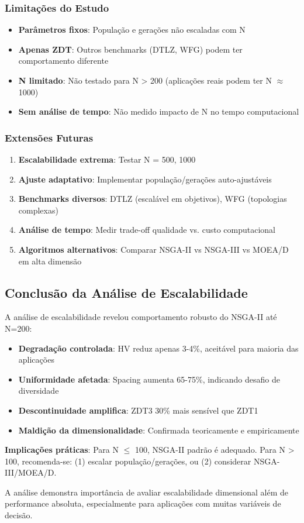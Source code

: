 \subsubsection{Limitações do Estudo}

\begin{itemize}
    \item \textbf{Parâmetros fixos}: População e gerações não escaladas com N
    \item \textbf{Apenas ZDT}: Outros benchmarks (DTLZ, WFG) podem ter comportamento diferente
    \item \textbf{N limitado}: Não testado para N > 200 (aplicações reais podem ter N $\approx$ 1000)
    \item \textbf{Sem análise de tempo}: Não medido impacto de N no tempo computacional
\end{itemize}

\subsubsection{Extensões Futuras}

\begin{enumerate}
    \item \textbf{Escalabilidade extrema}: Testar N = 500, 1000
    \item \textbf{Ajuste adaptativo}: Implementar população/gerações auto-ajustáveis
    \item \textbf{Benchmarks diversos}: DTLZ (escalável em objetivos), WFG (topologias complexas)
    \item \textbf{Análise de tempo}: Medir trade-off qualidade vs. custo computacional
    \item \textbf{Algoritmos alternativos}: Comparar NSGA-II vs NSGA-III vs MOEA/D em alta dimensão
\end{enumerate}

\subsection{Conclusão da Análise de Escalabilidade}

A análise de escalabilidade revelou comportamento robusto do NSGA-II até N=200:

\begin{itemize}
    \item \textbf{Degradação controlada}: HV reduz apenas 3-4\%, aceitável para maioria das aplicações
    \item \textbf{Uniformidade afetada}: Spacing aumenta 65-75\%, indicando desafio de diversidade
    \item \textbf{Descontinuidade amplifica}: ZDT3 30\% mais sensível que ZDT1
    \item \textbf{Maldição da dimensionalidade}: Confirmada teoricamente e empiricamente
\end{itemize}

\textbf{Implicações práticas}: Para N $\leq$ 100, NSGA-II padrão é adequado. Para N > 100, recomenda-se:
(1) escalar população/gerações, ou (2) considerar NSGA-III/MOEA/D.

A análise demonstra importância de avaliar escalabilidade dimensional além de performance absoluta, especialmente para aplicações com muitas variáveis de decisão.
